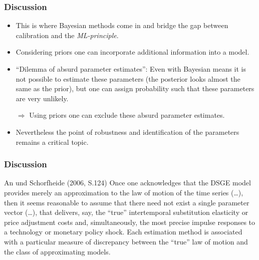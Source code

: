 \documentclass{beamer} %
\begin{document}
\begin{frame}\frametitle{Discussion}
  \begin{itemize}
    \item This is where Bayesian methods come in and bridge the gap between calibration and the \emph{ML-principle}.
    \item Considering priors one can incorporate additional information into a model.
    \item \enquote{Dilemma of absurd parameter estimates}: Even with Bayesian means it is not possible to estimate these parameters (the posterior looks almost the same as the prior), but one can assign probability such that these parameters are very unlikely.
    \item[$\Rightarrow$] Using priors one can exclude these absurd parameter estimates.
    \item Nevertheless the point of robustness and identification of the parameters remains a critical topic.
  \end{itemize}
\end{frame}

\begin{frame}\frametitle{Discussion}

\begin{block}{An und Schorfheide (2006, S.124)}
Once one acknowledges that the DSGE model provides merely an approximation to
the law of motion of the time series (\dots), then it seems reasonable to
assume that there need not exist a single parameter vector (\dots), that
delivers, say, the \enquote{true} intertemporal substitution elasticity or
price adjustment costs and, simultaneously, the most precise impulse
responses to a technology or monetary policy shock. Each estimation method is
associated with a particular measure of discrepancy between the
\enquote{true} law of motion and the class of approximating models.
\end{block}
\end{frame}
\end{document}
